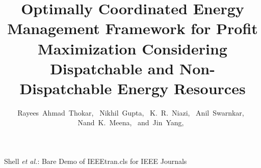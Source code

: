 \documentclass[journal]{IEEEtran}
\begin{document}
\title{Optimally Coordinated Energy Management Framework for Profit
	Maximization Considering Dispatchable and Non-Dispatchable Energy Resources}
\author{Rayees~Ahmad~Thokar,~
	Nikhil~Gupta,~
	K.~R.~Niazi,~
	Anil~Swarnkar,~
	Nand~K.~Meena,~
	and~Jin~Yang,~%
\vspace{-0.8cm}}
%
{Shell \MakeLowercase{\textit{et al.}}: Bare Demo of IEEEtran.cls for IEEE Journals}
\maketitle
%
\end{document}
